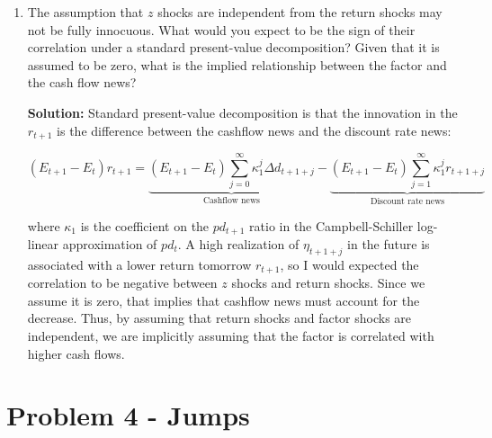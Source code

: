 \documentclass{article}
\begin{document}
\begin{enumerate}
\item The assumption that $z$ shocks are independent from the return shocks may not be fully innocuous. What would you expect to be the sign of their correlation under a standard present-value decomposition? Given that it is assumed to be zero, what is the implied relationship between the factor and the cash flow news?

\bigskip

\textbf{Solution:} Standard present-value decomposition is that the innovation in the $r_{t+1}$ is the difference between the cashflow news and the discount rate news:

$$
(E_{t+1} - E_t) r_{t+1} = \underbrace{(E_{t+1} - E_t) \sum_{j=0}^\infty \kappa_1^j \Delta d_{t+1+j}}_{\text{Cashflow news}} - \underbrace{(E_{t+1} - E_t) \sum_{j=1}^{\infty} \kappa_1^j r_{t+1+j}}_{\text{Discount rate news}}
$$

where $\kappa_1$ is the coefficient on the $pd_{t+1}$ ratio in the Campbell-Schiller log-linear approximation of $pd_t$.  A high realization of $\eta_{t+1+j}$ in the future is associated with a lower return tomorrow $r_{t+1}$, so I would expected the correlation to be negative between $z$ shocks and return shocks. Since we assume it is zero, that implies that cashflow news must account for the decrease.  Thus, by assuming that return shocks and factor shocks are independent, we are implicitly assuming that the factor is correlated with higher cash flows.

\end{enumerate}

\pagebreak

\section{Problem 4 - Jumps}
\end{document}
